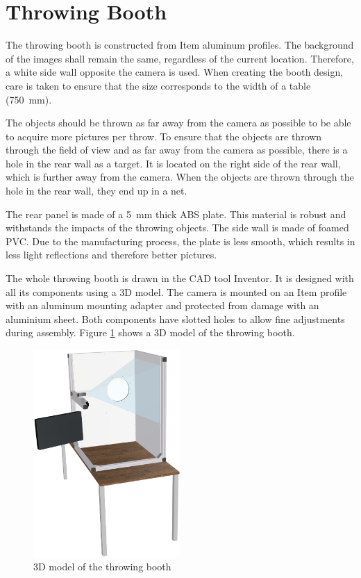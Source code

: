 \section{Throwing Booth}
\label{sec:hardware:throwing_booth}

The throwing booth is constructed from Item aluminum profiles.
The background of the images shall remain the same, regardless of the current location.
Therefore, a white side wall opposite the camera is used.
When creating the booth design, care is taken to ensure that the size corresponds to the width of a table (\SI{750}{mm}).

The objects should be thrown as far away from the camera as possible to be able to acquire more pictures per throw.
To ensure that the objects are thrown through the field of view and as far away from the camera as possible, there is a hole in the rear wall as a target.
It is located on the right side of the rear wall, which is further away from the camera.
When the objects are thrown through the hole in the rear wall, they end up in a net.

The rear panel is made of a \SI{5}{mm} thick ABS plate.
This material is robust and withstands the impacts of the throwing objects.
The side wall is made of foamed PVC.
Due to the manufacturing process, the plate is less smooth, which results in less light reflections and therefore better pictures.

The whole throwing booth is drawn in the CAD tool Inventor. It is designed with all its components using a 3D model.
The camera is mounted on an Item profile with an aluminum mounting adapter and protected from damage with an aluminium sheet.
Both components have slotted holes to allow fine adjustments during assembly.
Figure \ref{fig:booth} shows a 3D model of the throwing booth.

\begin{figure}[h]
  \centering
  \includegraphics[width=0.5\textwidth]{graphics/top_assembly.png}
  \caption{3D model of the throwing booth}
  \label{fig:booth}
\end{figure}
